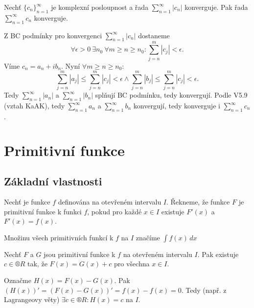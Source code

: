 \documentclass[12pt]{article}                   %
\begin{document}
        \begin{veta}
            Nechť $\{c_n\}_{n = 1}^∞$ je komplexní posloupnost a řada $\sum_{n=1}^∞ |c_n|$ konverguje. Pak řada $\sum_{n=1}^∞ c_n$ konverguje.

            \begin{dukazin}
                Z BC podmínky pro konvergenci $\sum_{n=1}^∞ |c_n|$ dostaneme
                $$ \forall \epsilon > 0\ \exists n_0\ \forall m ≥ n ≥ n_0: \sum_{j=n}^m |c_j| < \epsilon. $$ 
                Víme $c_n = a_n + ib_n$. Nyní $\forall m ≥ n ≥ n_0:$
                $$ \sum_{j=n}^m |a_j| ≤ \sum_{j=n}^m |c_j| < \epsilon \land \sum_{j=n}^m |b_j| ≤ \sum_{j=n}^m |c_j| < \epsilon. $$ 
                Tedy $\sum_{n=1}^∞ |a_n|$ a $\sum_{n=1}^∞ |b_n|$ splňují BC podmínku, tedy konvergují. Podle V5.9 (vztah KaAK), tedy $\sum_{n=1}^∞ a_n$ a $\sum_{n=1}^∞ b_n$ konvergují, tedy konverguje i $\sum_{n=1}^∞ c_n$.
            \end{dukazin}
        \end{veta}


\section{Primitivní funkce}
    \subsection{Základní vlastnosti}
        \begin{definice}
            Nechť je funkce $f$ definována na otevřeném intervalu $I$. Řekneme, že funkce $F$ je primitivní funkce k funkci $f$, pokud pro každé $x\in I$ existuje $F'(x)$ a $F'(x) = f(x)$.

            Množinu všech primitivních funkcí k $f$ na $I$ značíme $\int f(x)\, dx$
        \end{definice}

        \begin{veta}
            Nechť $F$ a $G$ jsou primitivní funkce k $f$ na otevřeném intervalu $I$. Pak existuje $c \in ®R$ tak, že $F(x) = G(x)+c$ pro všechna $x \in I$.

            \begin{dukazin}
                Označme $H(x) = F(x) - G(x)$. Pak $(H(x))' = (F(x) - G(x))' = f(x) - f(x) = 0$. Tedy (např. z Lagrangeovy věty) $\exists c \in ®R: H(x) = c$ na $I$.
            \end{dukazin}
        \end{veta}
\end{document}
